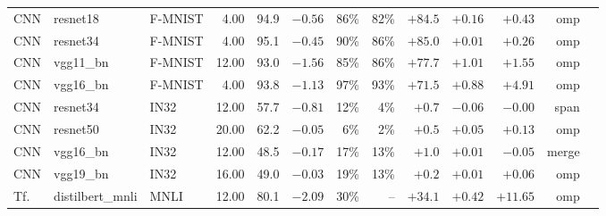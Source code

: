 \begin{tabular}{lllrrrrrrrrrl}
CNN & resnet18 & F-MNIST & 4.00 & 94.9 & $-0.56$ & 86\% & 82\% & $+84.5$ & $+0.16$ & $+0.43$ & omp\\
CNN & resnet34 & F-MNIST & 4.00 & 95.1 & $-0.45$ & 90\% & 86\% & $+85.0$ & $+0.01$ & $+0.26$ & omp\\
CNN & vgg11\_bn & F-MNIST & 12.00 & 93.0 & $-1.56$ & 85\% & 86\% & $+77.7$ & $+1.01$ & $+1.55$ & omp\\
CNN & vgg16\_bn & F-MNIST & 4.00 & 93.8 & $-1.13$ & 97\% & 93\% & $+71.5$ & $+0.88$ & $+4.91$ & omp\\
CNN & resnet34 & IN32 & 12.00 & 57.7 & $-0.81$ & 12\% & 4\% & $+0.7$ & $-0.06$ & $-0.00$ & span\\
CNN & resnet50 & IN32 & 20.00 & 62.2 & $-0.05$ & 6\% & 2\% & $+0.5$ & $+0.05$ & $+0.13$ & omp\\
CNN & vgg16\_bn & IN32 & 12.00 & 48.5 & $-0.17$ & 17\% & 13\% & $+1.0$ & $+0.01$ & $-0.05$ & merge\\
CNN & vgg19\_bn & IN32 & 16.00 & 49.0 & $-0.03$ & 19\% & 13\% & $+0.2$ & $+0.01$ & $+0.06$ & omp\\
Tf. & distilbert\_mnli & MNLI & 12.00 & 80.1 & $-2.09$ & 30\% & -- & $+34.1$ & $+0.42$ & $+11.65$ & omp\\
\bottomrule
\end{tabular}
